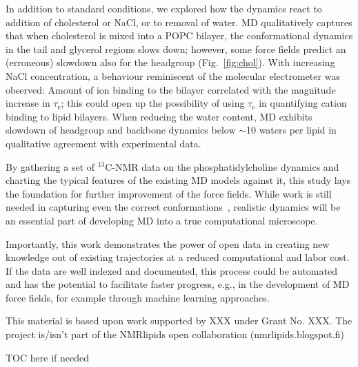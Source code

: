 \documentclass[journal=jcisd8,manuscript=article,layout=twocolumn]{achemso}
\begin{document}

In addition to standard conditions, we explored how the dynamics react to addition of cholesterol or NaCl, or to removal of water.
%
MD qualitatively captures that when cholesterol is mixed into a POPC bilayer, the conformational dynamics in the tail and glycerol regions slows down; however, some force fields predict an (erroneous) slowdown also for the headgroup (Fig.~\ref{fig:chol}).
%
With increasing NaCl concentration, a behaviour reminiscent of the molecular electrometer was observed: Amount of ion binding to the bilayer correlated with the magnitude increase in $\tau_\mathrm e$; this could open up the possibility of using $\tau_\mathrm e$ in quantifying cation binding to lipid bilayers.
%
When reducing the water content, MD exhibits slowdown of headgroup and backbone dynamics below $\sim$10 waters per lipid in qualitative agreement with experimental data. 

By gathering a set of $^{13}$C-NMR data on the phosphatidylcholine dynamics and charting the typical features of the existing MD models against it, this study lays the foundation for further improvement of the force fields. While work is still needed in capturing even the correct conformations~\cite{botan15}, realistic dynamics will be an essential part of developing MD into a true computational microscope.

Importantly, this work demonstrates the power of open data in creating new knowledge out of existing trajectories at a reduced computational and labor cost. %
If the data are well indexed and documented, this process could be automated and has the potential to facilitate faster progress, e.g., in the development of MD force fields, for example through machine learning approaches.


\acknowledgement
  This material is based upon work supported by XXX under Grant No. XXX. The project is/isn't part of the NMRlipids open collaboration (nmrlipids.blogspot.fi)


\begin{tocentry}
 TOC here if needed
\end{tocentry}
\end{document}
